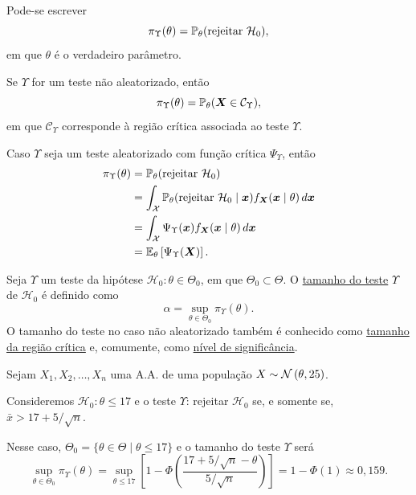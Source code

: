 \begin{note}
Pode-se escrever
\begin{equation}
\pi_\Upsilon(\theta)=\P_\theta(\text{rejeitar }\mathcal{H}_0),
\end{equation}
em que $\theta$ é o verdadeiro parâmetro.

Se $\Upsilon$ for um teste não aleatorizado, então
\begin{equation}
\pi_\Upsilon(\theta)=\P_\theta(\v{X}\in\mathcal{C}_\Upsilon),
\end{equation}
em que $\mathcal{C}_\Upsilon$ corresponde à região crítica associada ao teste $\Upsilon$.

Caso $\Upsilon$ seja um teste aleatorizado com função crítica $\Psi_\Upsilon$, então
\begin{align}
\pi_\Upsilon(\theta) &= \P_\theta(\text{rejeitar }\mathcal{H}_0)\notag\\
&= \int_{\mathcal{X}} \P_\theta(\text{rejeitar }\mathcal{H}_0\mid\v{x})f_{\v{X}}(\v{x}\mid\theta)\,d\v{x}\notag\\
&= \int_{\mathcal{X}} \Psi_\Upsilon(\v{x})f_{\v{X}}(\v{x}\mid\theta)\,d\v{x}\notag\\
&= \E_\theta\left[\Psi_\Upsilon(\v{X})\right].
\end{align}
\end{note}

\begin{definition}
Seja $\Upsilon$ um teste da hipótese $\mathcal{H}_0:\theta\in\Theta_0$, em que $\Theta_0\subset\Theta$. O \uline{tamanho do teste} $\Upsilon$ de $\mathcal{H}_0$ é definido como
\begin{equation}
\alpha=\sup_{\theta\in\Theta_0}\pi_\Upsilon(\theta).
\end{equation}
O tamanho do teste no caso não aleatorizado também é conhecido como \uline{tamanho da região crítica} e, comumente, como \uline{nível de significância}.
\end{definition}

\begin{example}
Sejam $X_1,X_2,\ldots,X_n$ uma A.A. de uma população $X\sim\normdist{\theta,25}$.

Consideremos $\mathcal{H}_0:\theta\leq17$ e o teste $\Upsilon$: rejeitar $\mathcal{H}_0$ se, e somente se, $\bar{x}>17+5/\sqrt{n}$.

Nesse caso, $\Theta_0=\{\theta\in\Theta\mid\theta\leq17\}$ e o tamanho do teste $\Upsilon$ será
\begin{equation}
\sup_{\theta\in\Theta_0}\pi_\Upsilon(\theta)=\sup_{\theta\leq17}\left[1-\Phi\left(\frac{17+5/\sqrt{n}-\theta}{5/\sqrt{n}}\right)\right]=1-\Phi(1)\approx0{,}159.
\end{equation}
\end{example}

